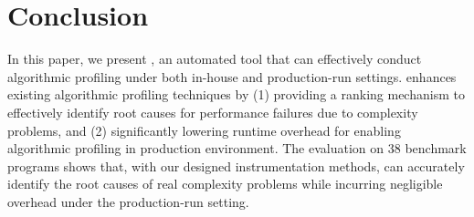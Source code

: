 \section{Conclusion}
\label{sec:con}

In this paper, we present \Tool, an automated tool that can effectively conduct algorithmic profiling
under both in-house and production-run settings.
\Tool enhances existing algorithmic profiling techniques by 
(1) providing a ranking mechanism to effectively identify root 
causes for performance failures due to complexity problems, 
and (2) significantly lowering runtime overhead 
for enabling algorithmic profiling in production environment. 
The evaluation on 38 benchmark programs shows that, with our designed instrumentation
methods, \Tool can accurately identify the root causes 
of real complexity problems
while incurring negligible overhead under the production-run setting. 

